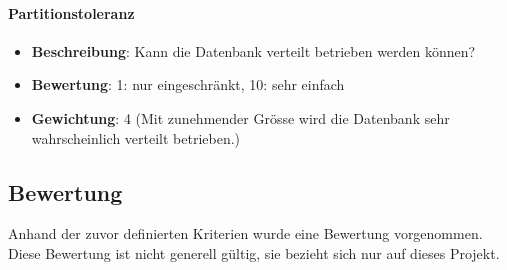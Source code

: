 \paragraph{Partitionstoleranz}
\begin{itemize}
	\item \textbf{Beschreibung}: Kann die Datenbank verteilt betrieben werden können?
	\item \textbf{Bewertung}: 1: nur eingeschränkt, 10: sehr einfach
	\item \textbf{Gewichtung}: 4 (Mit zunehmender Grösse wird die Datenbank sehr wahrscheinlich verteilt betrieben.)
\end{itemize}

\newpage
\subsection{Bewertung}\label{architektur_bewertung}
Anhand der zuvor definierten Kriterien wurde eine Bewertung vorgenommen. Diese Bewertung ist nicht generell gültig, sie bezieht sich nur auf dieses Projekt.

